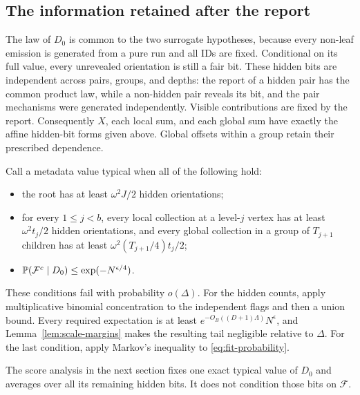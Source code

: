 \subsection{The information retained after the report}\label{sec:metadata}

The law of $D_0$ is common to the two surrogate hypotheses, because every non-leaf emission is generated from a pure run and all IDs are fixed.  Conditional on its full value, every unrevealed orientation is still a fair bit.  These hidden bits are independent across pairs, groups, and depths: the report of a hidden pair has the common product law, while a non-hidden pair reveals its bit, and the pair mechanisms were generated independently.  Visible contributions are fixed by the report.  Consequently $X$, each local sum, and each global sum have exactly the affine hidden-bit forms given above.  Global offsets within a group retain their prescribed dependence.

Call a metadata value typical when all of the following hold:
\begin{itemize}
\item the root has at least $\omega^2J/2$ hidden orientations;
\item for every $1\le j<b$, every local collection at a level-$j$ vertex has at least $\omega^2t_j/2$ hidden orientations, and every global collection in a group of $T_{j+1}$ children has at least $\omega^2(T_{j+1}/4)t_j/2$;
\item $\mathbb P(\mathcal F^c\mid D_0)\le\exp(-N^{\epsilon/4})$.
\end{itemize}
These conditions fail with probability $o(\Delta)$.  For the hidden counts, apply multiplicative binomial concentration to the independent flags and then a union bound.  Every required expectation is at least $e^{-O_B((D+1)\Lambda)}N^\epsilon$, and Lemma~\ref{lem:scale-margins} makes the resulting tail negligible relative to $\Delta$.  For the last condition, apply Markov's inequality to \eqref{eq:fit-probability}.

The score analysis in the next section fixes one exact typical value of $D_0$ and averages over all its remaining hidden bits.  It does not condition those bits on $\mathcal F$.
